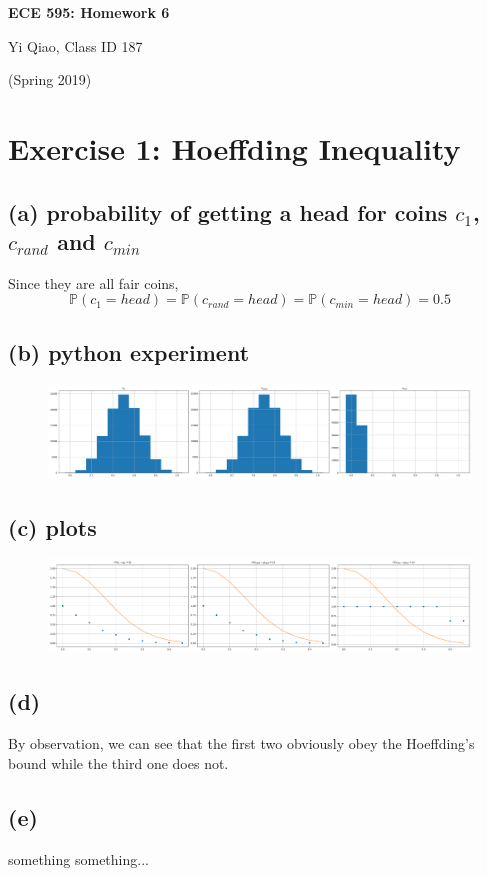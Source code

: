 \documentclass[11pt]{article}
\begin{document}
\begin{center}
\Large{\textbf{ECE 595: Homework 6}}

Yi Qiao, Class ID 187

(Spring 2019)
\end{center}

\section*{Exercise 1: Hoeffding Inequality}
\subsection*{(a) probability of getting a head for coins $c_1$, $c_{rand}$ and $c_{min}$}
Since they are all fair coins,
$$\mathbb{P}(c_1=head)=\mathbb{P}(c_{rand}=head)=\mathbb{P}(c_{min}=head)=0.5$$
\subsection*{(b) python experiment}
\begin{figure}[h]
	\centering
	\includegraphics[width=\linewidth]{exercise1_b}
\end{figure}
\subsection*{(c) plots}
\begin{figure}[h]
	\centering
	\includegraphics[width=\linewidth]{exercise1_c}
\end{figure}
\subsection*{(d)}
By observation, we can see that the first two obviously obey the Hoeffding's bound while the third one does not.
\subsection*{(e)}
something something...
\pagebreak
\end{document}
